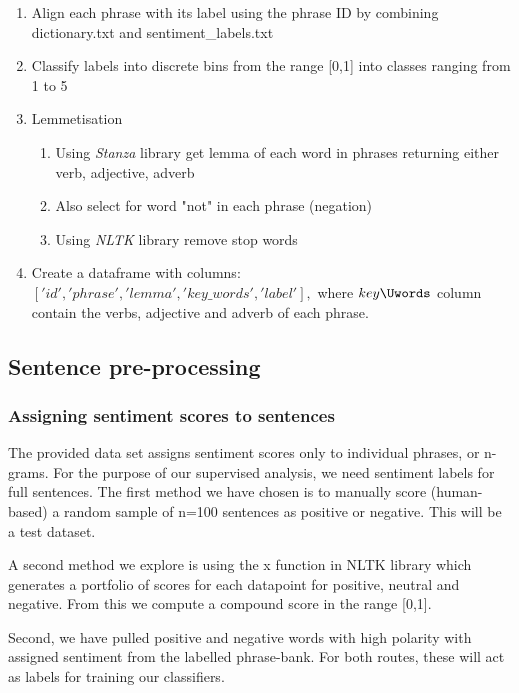 \documentclass[10pt, a4paper]{article}
\begin{document}
\begin{enumerate} 
    \item Align each phrase with its label using the phrase ID by combining dictionary.txt and sentiment\_labels.txt
    \item Classify labels into discrete bins from the range [0,1] into classes ranging from 1 to 5
    \item Lemmetisation
    \begin{enumerate}
        \item Using \textit{Stanza} library get lemma of each word in phrases returning either verb, adjective, adverb
        \item Also select for word "not" in each phrase (negation)
        \item Using \textit{NLTK} library remove stop words 
    \end{enumerate}
    \item Create a dataframe with columns: $['id', 'phrase', 'lemma', 'key\_words', 'label'],$ where $key\Uwords$ column contain the verbs, adjective and adverb of each phrase.
\end{enumerate}
    
    
    
    

\subsection{Sentence pre-processing}

\subsubsection{Assigning sentiment scores to sentences}
The provided data set assigns sentiment scores only to individual phrases, or n-grams. For the purpose of our supervised analysis, we need sentiment labels for full sentences. The first method we have chosen is to manually score (human-based) a random sample of n=100 sentences as positive or negative. This will be a test dataset.

A second method we explore is using the x function in NLTK library which generates a portfolio of scores for each datapoint for positive, neutral and negative. From this we compute a compound score in the range [0,1]. 




Second, we have pulled positive and negative words with high polarity with assigned sentiment from the labelled phrase-bank. For both routes, these will act as labels for training our classifiers. 
\end{document}
